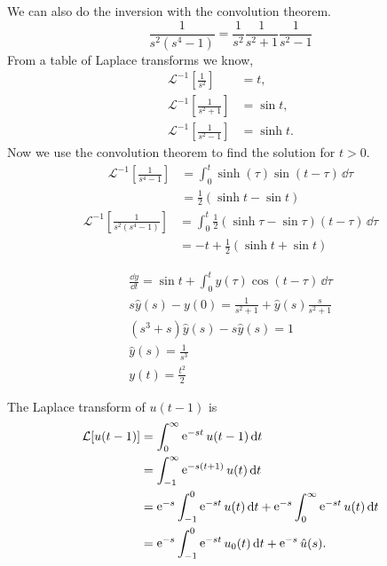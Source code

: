 {\begin{Solution}
  We can also do the inversion with the convolution theorem.
  \[
  \frac{1}{s^2 (s^4 - 1)} = \frac{1}{s^2} \frac{1}{s^2 + 1} \frac{1}{s^2-1}
  \]
  From a table of Laplace transforms we know,
  \begin{align*}
    \mathcal{L}^{-1} \left[ \frac{1}{s^2} \right] &= t, \\
    \mathcal{L}^{-1} \left[ \frac{1}{s^2 + 1} \right] &= \sin t, \\
    \mathcal{L}^{-1} \left[ \frac{1}{s^2 - 1} \right] &= \sinh t.
  \end{align*}
  Now we use the convolution theorem to find the solution for $t > 0$.
  \begin{align*}
    \mathcal{L}^{-1} \left[ \frac{1}{s^4 - 1} \right]
    &= \int_0^t \sinh(\tau) \sin(t-\tau) \,\dd \tau \\
    &= \frac{1}{2} \left( \sinh t - \sin t \right)
  \end{align*}
  \begin{align*}
    \mathcal{L}^{-1} \left[ \frac{1}{s^2 (s^4 - 1)} \right]
    &= \int_0^t \frac{1}{2} \left( \sinh \tau - \sin \tau \right)(t - \tau) \,\dd \tau \\
    &= - t + \frac{1}{2} \left( \sinh t + \sin t \right)
  \end{align*}
\end{Solution}







\begin{Solution}
  \label{solution y'=sin t int y cos}
  \begin{gather*}
    \frac{\dd y}{\dd t} = \sin t + \int_0^t y(\tau) \cos(t - \tau) \,\dd \tau \\
    s \hat{y}(s) - y(0) = \frac{1}{s^2 + 1} + \hat{y}(s) \frac{s}{s^2+1} \\
    (s^3 + s) \hat{y}(s) - s \hat{y}(s) = 1 \\
    \hat{y}(s) = \frac{1}{s^3} \\
    \boxed{
      y(t) = \frac{t^2}{2}
      }
  \end{gather*}
\end{Solution}







\begin{Solution}
  \label{solution u'+u-u(t-1)=0}
  The Laplace transform of $u(t-1)$ is
  \begin{align*}
    \mathcal{L}[u(t-1)]
    &= \int_0^\infty \mathop{\mathrm{e}}\nolimits^{-s t} u(t-1) \,\mathrm{d} t \\
    &= \int_{-1}^\infty \mathop{\mathrm{e}}\nolimits^{-s (t + 1)} u(t) \,\mathrm{d} t \\
    &= \mathop{\mathrm{e}}\nolimits^{-s} \int_{-1}^0 \mathop{\mathrm{e}}\nolimits^{-s t} u(t) \,\mathrm{d} t + \mathop{\mathrm{e}}\nolimits^{-s} \int_0^\infty \mathop{\mathrm{e}}\nolimits^{-s t} u(t) \,\mathrm{d} t \\
    &= \mathop{\mathrm{e}}\nolimits^{-s} \int_{-1}^0 \mathop{\mathrm{e}}\nolimits^{-s t} u_0(t) \,\mathrm{d} t + \mathop{\mathrm{e}}\nolimits^{-s} \hat{u}(s).
  \end{align*}


\end{Solution}}
